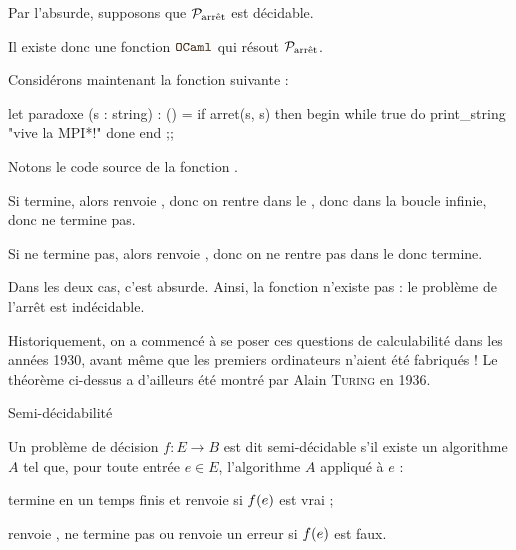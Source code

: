 \documentclass[a4paper,french,bookmarks]{book}
\newcommand{\langOcaml}{\texttt{\color{ocamlColor!20!black}OCaml}}
\begin{document}
    \begin{nproof}
        Par l'absurde, supposons que $\mathcal{P}_\text{arrêt}$ est décidable.
        
        Il existe donc une fonction $\langOcaml$  qui résout $\mathcal{P}_\text{arrêt}$.
        
        Considérons maintenant la fonction  suivante :
        \begin{ocaml}
let paradoxe (s : string) : () =
    if arret(s, s) then
        begin
            while true do
                print_string "vive la MPI*!"
            done
        end
;;
        \end{ocaml}
        
        Notons  le code source de la fonction .
        
        \begin{enumerate}
            \itt Si  termine, alors  renvoie , donc on rentre dans le , donc dans la boucle infinie, donc  ne termine pas.
            
            \itt Si  ne termine pas, alors  renvoie , donc on ne rentre pas dans le  donc  termine.
        \end{enumerate}
        
        Dans les deux cas, c'est absurde. Ainsi, la fonction  n'existe pas : le problème de l'arrêt est indécidable.
    \end{nproof}
    
    Historiquement, on a commencé à se poser ces questions de calculabilité dans les années 1930, avant même que les premiers ordinateurs n'aient été fabriqués ! Le théorème ci-dessus a d'ailleurs été montré par Alain \textsc{Turing} en 1936.
    
    
    \begin{definition}{Semi-décidabilité}{}
        
        Un problème de décision $f: E \to B$ est dit semi-décidable s'il existe un algorithme $A$ tel que, pour toute entrée $e \in E$, l'algorithme $A$ appliqué à $e$ :
        \begin{enumerate}
            \itast termine en un temps finis et renvoie  si $f\!\left(e\right)$ est vrai ;
            
            \itast renvoie , ne termine pas ou renvoie un erreur si $f\!\left(e\right)$ est faux.
        \end{enumerate}
    \end{definition}
    
\end{document}
